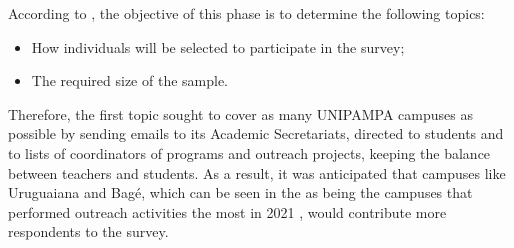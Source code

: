 
According to , the objective of this phase is to determine the following topics:
\begin{itemize}
    \item How individuals will be selected to participate in the survey;
    \item The required size of the sample.
\end{itemize}


Therefore, the first topic sought to cover as many \ac{UNIPAMPA} campuses as possible by sending emails to its Academic Secretariats, directed to students and to lists of coordinators of programs and outreach projects, keeping the balance between teachers and students.
As a result, it was anticipated that campuses like Uruguaiana and Bagé, which can be seen in the  as being the campuses that performed outreach activities the most in 2021 \cite{relatorio-2021}, would contribute more respondents to the survey.

